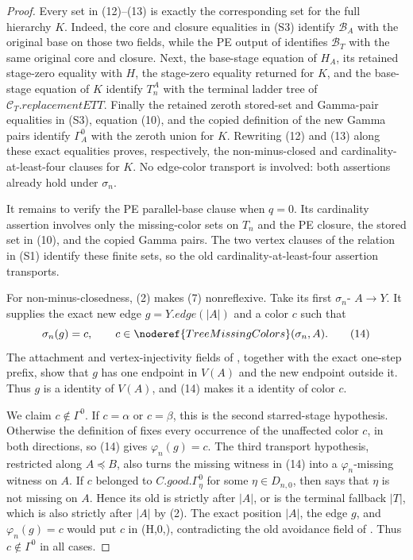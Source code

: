 \begin{proof}
Every set in (12)--(13) is exactly the corresponding set for the full
hierarchy \(K\).  Indeed, the core and closure equalities in (S3) identify
\(\mathcal B_A\) with the original base on those two fields, while the
PE output of  identifies
\(\mathcal B_T\) with the same original core and closure.  Next,
the base-stage equation of \(H_A\), its retained stage-zero equality
with \(H\), the stage-zero equality returned for \(K\), and the
base-stage equation of \(K\) identify \(T_n^A\) with the terminal ladder
tree of \(\mathcal C_T.\mathit{replacementETT}\).  Finally the retained
zeroth stored-set and Gamma-pair equalities in (S3), equation (10), and
the copied definition of the new Gamma pairs identify
\(\Gamma_A^0\) with the zeroth union for \(K\).  Rewriting (12) and (13)
along these exact equalities proves, respectively, the non-minus-closed
and cardinality-at-least-four clauses for \(K\).  No edge-color transport
is involved: both assertions already hold under \(\sigma_n\).

It remains to verify the PE parallel-base clause when \(q=0\).  Its
cardinality assertion involves only the missing-color sets on \(T_n\) and
the PE closure, the stored set in (10), and the copied Gamma pairs.  The
two vertex clauses of the  relation in
(S1) identify these finite sets, so the old cardinality-at-least-four
assertion transports.

For non-minus-closedness, (2) makes (7) nonreflexive.  Take its first
\(\sigma_n\)- \(A\to Y\).  It supplies the
exact new edge \(g=Y.\mathit{edge}(|A|)\) and a color \(c\) such that
\[
                 \sigma_n(g)=c,\qquad
                 c\in\noderef{TreeMissingColors}(\sigma_n,A). \tag{14}
\]
The attachment and vertex-injectivity fields of
, together with the exact one-step prefix, show
that \(g\) has one endpoint in \(V(A)\) and the new endpoint outside it.
Thus \(g\) is a  identity of \(V(A)\), and (14)
makes it a  identity of color \(c\).

We claim \(c\notin\Gamma^0\).  If \(c=\alpha\) or \(c=\beta\), this is
the second starred-stage hypothesis.  Otherwise the definition of
 fixes every occurrence of the unaffected
color \(c\), in both directions, so (14) gives
\(\varphi_n(g)=c\).  The third transport hypothesis, restricted along
\(A\preccurlyeq B\), also turns the missing witness in (14) into a
\(\varphi_n\)-missing witness on \(A\).  If \(c\) belonged to
\(C.\mathit{good}.\Gamma^0_\eta\) for some
\(\eta\in D_{n,0}\), then
 says that \(\eta\) is not missing on
\(A\).  Hence its old
 is strictly after \(|A|\), or is
the terminal fallback \(|T|\), which is also strictly after \(|A|\) by
(2).  The exact position \(|A|\), the edge \(g\), and
\(\varphi_n(g)=c\) would put \(c\) in
(H,0,\eta)\), contradicting the old
avoidance field of .  Thus \(c\notin\Gamma^0\) in
all cases.


\end{proof}
